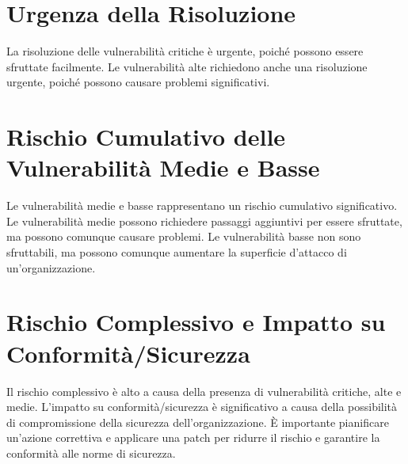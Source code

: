 \section{Urgenza della Risoluzione}

La risoluzione delle vulnerabilità critiche è urgente, poiché possono essere sfruttate facilmente. Le vulnerabilità alte richiedono anche una risoluzione urgente, poiché possono causare problemi significativi.

\section{Rischio Cumulativo delle Vulnerabilità Medie e Basse}

Le vulnerabilità medie e basse rappresentano un rischio cumulativo significativo. Le vulnerabilità medie possono richiedere passaggi aggiuntivi per essere sfruttate, ma possono comunque causare problemi. Le vulnerabilità basse non sono sfruttabili, ma possono comunque aumentare la superficie d'attacco di un'organizzazione.

\section{Rischio Complessivo e Impatto su Conformità/Sicurezza}

Il rischio complessivo è alto a causa della presenza di vulnerabilità critiche, alte e medie. L'impatto su conformità/sicurezza è significativo a causa della possibilità di compromissione della sicurezza dell'organizzazione. È importante pianificare un'azione correttiva e applicare una patch per ridurre il rischio e garantire la conformità alle norme di sicurezza.


\begin{center}
\vspace{0cm}
\end{center}
